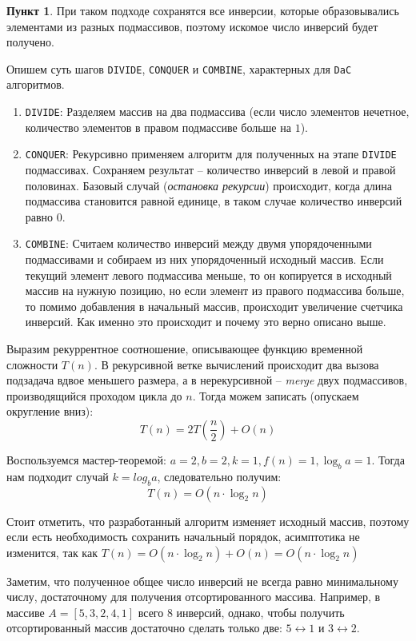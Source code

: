 \documentclass[11pt,a4paper]{scrarticle}
\theoremstyle{definition}
\newtheorem{subtask}{Пункт}
\begin{document}
\begin{subtask}
    При таком подходе сохранятся все инверсии, которые образовывались элементами из разных подмассивов, поэтому искомое число инверсий будет получено.

    Опишем суть шагов \texttt{DIVIDE}, \texttt{CONQUER} и \texttt{COMBINE}, характерных для \texttt{DaC} алгоритмов.

    \begin{enumerate}
        \item \texttt{DIVIDE}: Разделяем массив на два подмассива (если число элементов нечетное, количество элементов в правом подмассиве больше на $1$).
        \item \texttt{CONQUER}: Рекурсивно применяем алгоритм для полученных на этапе \texttt{DIVIDE} подмассивах. Сохраняем результат -- количество инверсий в левой и правой половинах. Базовый случай (\emph{остановка рекурсии}) происходит, когда длина подмассива становится равной единице, в таком случае количество инверсий равно $0$.
        \item \texttt{COMBINE}: Считаем количество инверсий между двумя упорядоченными подмассивами и собираем из них упорядоченный исходный массив. Если текущий элемент левого подмассива меньше, то он копируется в исходный массив на нужную позицию, но если элемент из правого подмассива больше, то помимо добавления в начальный массив, происходит увеличение счетчика инверсий. Как именно это происходит и почему это верно описано выше.
    \end{enumerate}

    Выразим рекуррентное соотношение, описывающее функцию временной сложности $T(n)$. В рекурсивной ветке вычислений происходит два вызова подзадача вдвое меньшего размера, а в нерекурсивной -- \emph{merge} двух подмассивов, производящийся проходом цикла до $n$. Тогда можем записать (опускаем округление вниз):
    \begin{equation}
        \label{eqn:rec}
        T(n) = 2T\left(\frac{n}{2}\right) + O(n)
    \end{equation}

    Воспользуемся мастер-теоремой: $a = 2, b = 2, k = 1, f(n) = 1, \log_b a = 1$. Тогда нам подходит случай $k = log_b a$, следовательно получим:
    \begin{equation}
        \label{eqn:bigoh}
        T(n) = O(n \cdot \log_2 n)
    \end{equation}

    Стоит отметить, что разработанный алгоритм изменяет исходный массив, поэтому если есть необходимость сохранить начальный порядок, асимптотика не изменится, так как \linebreak $T(n) = O(n \cdot \log_2 n) + O(n) = O(n \cdot \log_2 n)$

    Заметим, что полученное общее число инверсий не всегда равно минимальному числу, достаточному для получения отсортированного массива. Например, в массиве $A = [5, 3, 2, 4, 1]$ всего $8$ инверсий, однако, чтобы получить отсортированный массив достаточно сделать только две: $5 \leftrightarrow 1$ и $3 \leftrightarrow 2$.
\end{subtask}
\end{document}
